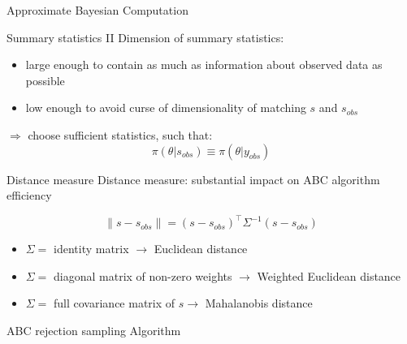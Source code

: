 \documentclass{beamer}
\begin{document}
\begin{section}{Approximate Bayesian Computation}
\begin{frame}{Summary statistics II}
		Dimension of summary statistics:
		\begin{itemize}
			\item large enough to contain as much as information about observed data as possible
			\item low enough to avoid curse of dimensionality of matching $s$ and $s_{obs}$
		\end{itemize}
		
		\vspace{0.3cm}
		$\Longrightarrow$ choose sufficient statistics, such that:
		\[   \pi(\theta|s_{obs}) \equiv \pi(\theta|y_{obs})   \]

	\end{frame}

	\begin{frame}{Distance measure}
		Distance measure: substantial impact on ABC algorithm efficiency
		
		\[  \parallel s - s_{obs} \parallel = (s - s_{obs})^\top \Sigma^{-1} (s - s_{obs}) \]
		
		\begin{itemize}
			\item $\Sigma = $ identity matrix $ \rightarrow$ Euclidean distance 
			\item $\Sigma =$ diagonal matrix of non-zero weights $ \rightarrow$ Weighted Euclidean distance 
			\item $\Sigma = $ full covariance matrix of $s \rightarrow$ Mahalanobis distance 
		\end{itemize}
	\end{frame}

	\begin{frame}{ABC rejection sampling Algorithm}


\end{frame}
\end{section}
\end{document}

